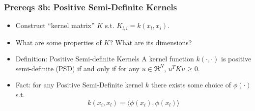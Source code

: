\documentclass{beamer}
\numberwithin{equation}{section}
\begin{document}
\begin{frame}
\frametitle{Prereqs 3b: Positive Semi-Definite Kernels}
\begin{itemize}
\item<1-> Construct ``kernel matrix'' $K$ s.t. $K_{l,i}=k(x_l,x_i)$.
\item<2-> What are some properties of $K$?  What are its dimensions?
\item<3->[] \footnotesize{
\begin{block}{Definition: Positive Semi-definite Kernels}
A kernel function $k(\cdot,\cdot)$ is positive semi-definite (PSD) if and only if for any $u \in \Re^{N} $, $u^T Ku\geq 0$.
\end{block}}
\item<4-> Fact:  for any Positive Semi-Definite kernel $k$ there exists some choice of $\phi(\cdot)$ s.t. $$k(x_i,x_l)=\langle \phi(x_i),\phi(x_l)\rangle$$
\end{itemize}
\end{frame}
\end{document}
